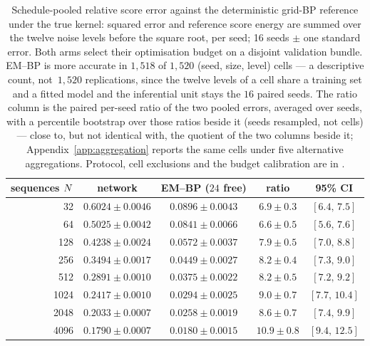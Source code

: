 
\begin{table}[!htbp]
\caption[Relative denoising error against training-set size]{Schedule-pooled relative score error against the deterministic grid-BP
reference under the true kernel: squared error and reference score energy are summed over the
twelve noise levels before the square root, per seed; 16 seeds $\pm$ one standard error.
Both arms select their optimisation budget on a disjoint validation bundle. EM--BP is
more accurate in $1{,}518$ of $1{,}520$ (seed, size, level) cells --- a
descriptive count, not $\,1{,}520$ replications, since the twelve levels of a
cell share a training set and a fitted model and the inferential unit stays the
$16$ paired seeds. The ratio
column is the paired per-seed ratio of the two pooled errors, averaged over seeds,
with a percentile bootstrap over those ratios beside it (seeds resampled, not
cells) --- close to, but
not identical with, the quotient of the two columns beside it;
Appendix~\ref{app:aggregation} reports the same cells under five alternative aggregations.
Protocol, cell exclusions and the budget calibration are in \provenanceappendix.}
\label{tab:pointwise}
\centering
\setlength{\tabcolsep}{4pt}
\begin{tabular}{rcccc}
\toprule
sequences $N$ & network & EM--BP ($24$ free) & ratio & 95\% CI \\
\midrule
32   & $0.6024 \pm 0.0046$ & $\mathbf{0.0896 \pm 0.0043}$ & $6.9 \pm 0.3$ & $[6.4,\, 7.5]$ \\
64   & $0.5025 \pm 0.0042$ & $\mathbf{0.0841 \pm 0.0066}$ & $6.6 \pm 0.5$ & $[5.6,\, 7.6]$ \\
128  & $0.4238 \pm 0.0024$ & $\mathbf{0.0572 \pm 0.0037}$ & $7.9 \pm 0.5$ & $[7.0,\, 8.8]$ \\
256  & $0.3494 \pm 0.0017$ & $\mathbf{0.0449 \pm 0.0027}$ & $8.2 \pm 0.4$ & $[7.3,\, 9.0]$ \\
512  & $0.2891 \pm 0.0010$ & $\mathbf{0.0375 \pm 0.0022}$ & $8.2 \pm 0.5$ & $[7.2,\, 9.2]$ \\
1024 & $0.2417 \pm 0.0010$ & $\mathbf{0.0294 \pm 0.0025}$ & $9.0 \pm 0.7$ & $[7.7,\, 10.4]$ \\
2048 & $0.2033 \pm 0.0007$ & $\mathbf{0.0258 \pm 0.0019}$ & $8.6 \pm 0.7$ & $[7.4,\, 9.9]$ \\
4096 & $0.1790 \pm 0.0007$ & $\mathbf{0.0180 \pm 0.0015}$ & $10.9 \pm 0.8$ & $[9.4,\, 12.5]$ \\
\bottomrule
\end{tabular}
\end{table}
